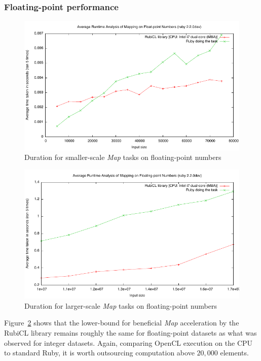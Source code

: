 \subsubsection{Floating-point performance}
\begin{figure}
  \includegraphics[width=\textwidth]{./graphing/smalldmap.pdf}
  \caption{Duration for smaller-scale \emph{Map} tasks on floating-point numbers}
  \label{fig:dmap_task_smallrun}
\end{figure}

\begin{figure}
  \includegraphics[width=\textwidth]{./graphing/dmaplarge.pdf}
  \caption{Duration for larger-scale \emph{Map} tasks on floating-point numbers}
  \label{fig:dmap_task_smallrun}
\end{figure}

Figure~\ref{fig:dmap_task_smallrun} shows that the lower-bound for beneficial \emph{Map} acceleration by the RubiCL library remains roughly the same for floating-point datasets as what was observed for integer datasets. Again, comparing \ac{OpenCL} execution on the \ac{CPU} to standard Ruby, it is worth outsourcing computation above $20,000$ elements.

